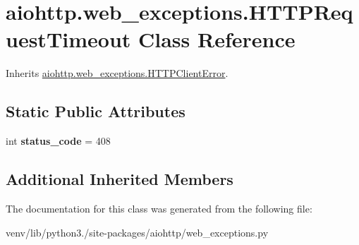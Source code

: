 \hypertarget{classaiohttp_1_1web__exceptions_1_1_h_t_t_p_request_timeout}{}\section{aiohttp.\+web\+\_\+exceptions.\+H\+T\+T\+P\+Request\+Timeout Class Reference}
\label{classaiohttp_1_1web__exceptions_1_1_h_t_t_p_request_timeout}


Inherits \hyperlink{classaiohttp_1_1web__exceptions_1_1_h_t_t_p_client_error}{aiohttp.\+web\+\_\+exceptions.\+H\+T\+T\+P\+Client\+Error}.

\subsection*{Static Public Attributes}
\begin{DoxyCompactItemize}
\item 
\mbox{\label{classaiohttp_1_1web__exceptions_1_1_h_t_t_p_request_timeout_a2d81630567a3db71c020581117b2d2d7}} 
int {\bfseries status\+\_\+code} = 408
\end{DoxyCompactItemize}
\subsection*{Additional Inherited Members}


The documentation for this class was generated from the following file\+:\begin{DoxyCompactItemize}
\item 
venv/lib/python3./site-\/packages/aiohttp/web\+\_\+exceptions.\+py\end{DoxyCompactItemize}
